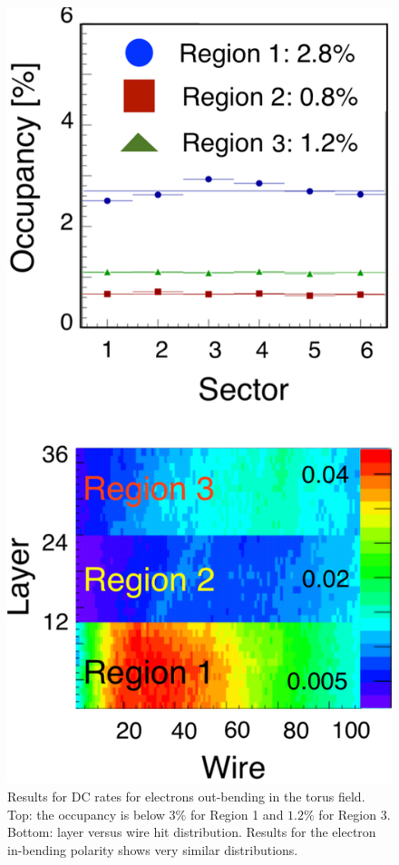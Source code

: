 \begin{figure}
	\centering
	\includegraphics[width=0.99\columnwidth,keepaspectratio]{img/dcOccupancy.png}
	\caption{Results for DC rates for electrons out-bending in the torus field.
		     Top: the occupancy is below $3\%$ for Region 1 and $1.2\%$ for Region 3. Bottom: layer
		     versus wire hit distribution. Results for the electron in-bending polarity shows very similar distributions.}
	\label{fig:dcOccupancy}
\end{figure}


